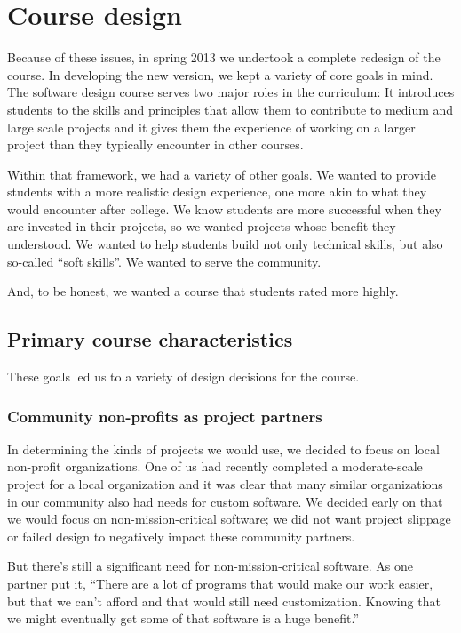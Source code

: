 \section{Course design}

Because of these issues, in spring 2013 we undertook a complete
redesign of the course.  In developing the new version, we kept a
variety of core goals in mind.  The software design course serves
two major roles in the curriculum: It introduces students to the
skills and principles that allow them to contribute to medium and
large scale projects and it gives them the experience of working
on a larger project than they typically encounter in other courses.

Within that framework, we had a variety of other goals. We wanted
to provide students with a more realistic design experience, one more
akin to what they would encounter after college.  We know students
are more successful when they are invested in their projects, so we
wanted projects whose benefit they understood.  We wanted to help
students build not only technical skills, but also so-called ``soft
skills''.  We wanted to serve the community.

And, to be honest, we wanted a course that students rated more highly.

\subsection{Primary course characteristics}

These goals led us to a variety of design decisions for the course.

\subsubsection{Community non-profits as project partners}

In determining the kinds of projects we would use, we decided to
focus on local non-profit organizations.  One of us had recently
completed a moderate-scale project for a local organization and it
was clear that many similar organizations in our community also had
needs for custom software.  We decided early on that we would focus
on non-mission-critical software; we did not want project slippage
or failed design to negatively impact these community partners.

But there's still a significant need for non-mission-critical software.
As one partner put it, ``There are a lot of programs that would make
our work easier, but that we can't afford and that would still need
customization.  Knowing that we might eventually get some of that
software is a huge benefit.''  

